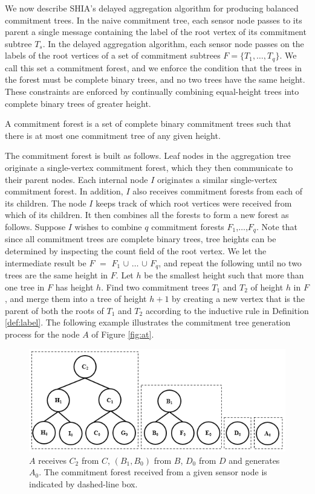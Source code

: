 		We now describe SHIA's delayed aggregation algorithm for producing balanced commitment trees.
		In the naive commitment tree, each sensor node passes to its parent a single message containing the label of the root vertex of its commitment subtree $T_{s}$.
		In the delayed aggregation algorithm, each sensor node passes on the labels of the root vertices of a set of commitment subtrees $F = \{ T_{1}, \dotsc, T_{q} \}$.
		We call this set a commitment forest, and we enforce the condition that the trees in the forest must be complete binary trees, and no two trees have the same height. 
		These constraints are enforced by continually combining equal-height trees into complete binary trees of greater height.
		\begin{definition}
			\cite{chan2006secure}
			\label{def:commitment-forest}
			A commitment forest is a set of complete binary commitment trees such that there is at most one commitment tree of any given height.
		\end{definition}
		The commitment forest is built as follows. 
		Leaf nodes in the aggregation tree originate a single-vertex commitment forest, which they then communicate to their parent nodes. 
		Each internal node $I$ originates a similar single-vertex commitment forest.
		In addition, $I$ also receives commitment forests from each of its children.
		The node $I$ keeps track of which root vertices were received from which of its children.
		It then combines all the forests to form a new forest as follows.
		Suppose $I$ wishes to combine $q$ commitment forests $F_{1}$,$\dotsc$,$F_{q}$.
		Note that since all commitment trees are complete binary trees, tree heights can be determined by inspecting the count field of the root vertex.
		We let the intermediate result be $F$ $=$ $F_{1}$ $\cup$ $\dotsc$ $\cup$ $F_{q}$, and repeat the following until no two trees are the same height in $F$.
		Let $h$ be the smallest height such that more than one tree in $F$ has height $h$.
		Find two commitment trees $T_{1}$ and $T_{2}$ of height $h$ in $F$, and merge them into a tree of height $h + 1$ by creating a new vertex that is the parent of both the roots of $T_{1}$ and $T_{2}$ according to the inductive rule in Definition \ref{def:label}.
		The following example illustrates the commitment tree generation process for the node $A$ of Figure \ref{fig:at}.
		\begin{figure}[h!]
			\includegraphics{images/commitment-tree-example-1-shia.png}
			\caption{$A$ receives $C_{2}$ from $C$, $(B_{1},B_{0})$ from $B$, $D_{0}$ from $D$ and generates $A_{0}$. The commitment forest received from a given sensor node is indicated by dashed-line box.}
			\label{fig:commitment-tree-example-1-shia}
		\end{figure}
